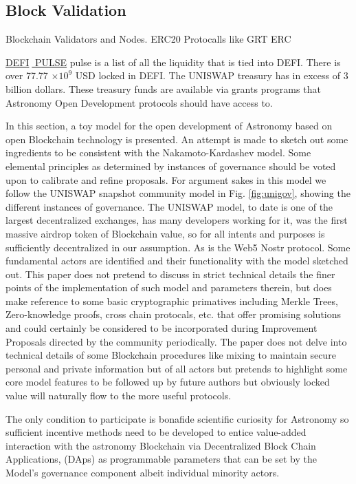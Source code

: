 \documentclass[final,5p,times,twocolumn,authoryear]{elsarticle}
\begin{document}
\subsection{Block Validation}
\label{subsec: validator}
Blockchain Validators and Nodes. ERC20 Protocalls like GRT ERC   

\href{https://defipulse.com/}{DEFI$\;$ PULSE} pulse is a list of all the liquidity that is tied into DEFI. There is over 77.77 $\times 10^{9}$ USD locked in DEFI. The UNISWAP treasury has in excess of 3 billion dollars. These treasury funds are available via grants programs that Astronomy Open Development protocols should have access to.

In this section, a toy model for the open development of Astronomy based on open Blockchain technology is presented. An attempt is made to sketch out some ingredients to be consistent with the Nakamoto-Kardashev model. Some elemental principles as determined by instances of governance should be voted upon to calibrate and refine proposals. For argument sakes in this model we follow the UNISWAP snapshot community model in Fig. \ref{fig:unigov}, showing the different instances of governance. The UNISWAP model, to date is one of the largest decentralized exchanges, has many developers working for it, was the first massive airdrop token of Blockchain value, so for all intents and purposes is sufficiently decentralized in our assumption. As is the Web5 Nostr protocol. Some fundamental actors are identified and their functionality with the model sketched out. This paper does not pretend to discuss in strict technical details the finer points of the implementation of such model and parameters therein, but does make reference to some basic cryptographic primatives including Merkle Trees, Zero-knowledge proofs, cross chain protocals, etc. that offer promising solutions and could certainly be considered to be incorporated during Improvement Proposals directed by the community periodically. The paper does not delve into technical details of some Blockchain procedures like mixing to maintain secure personal and private information but of all actors but pretends to highlight some core model features to be followed up by future authors but obviously  locked value will naturally flow to the more useful protocols.  
 
The only condition to participate is bonafide scientific curiosity for Astronomy so sufficient incentive methods need to be developed to entice value-added interaction with the astronomy Blockchain via Decentralized Block Chain Applications, (DAps) as programmable parameters that can be set by the Model's governance component albeit individual minority actors. 
\end{document}

